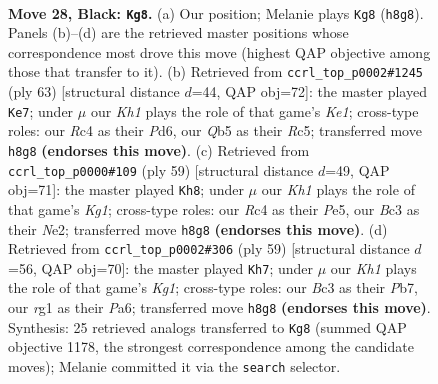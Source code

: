 \documentclass[11pt]{article}
\begin{document}
\clearpage

\begin{figure}[p]\centering
\begin{subfigure}{0.46\textwidth}\centering
\resizebox{\linewidth}{!}{%
\newchessgame
\chessboard[
  setfen={r6k/p7/4p1pQ/pq1p4/2rP2P1/2b5/2P5/3K2R1 b - - 1 28},
  showmover=false,
  pgfstyle=straightmove, color=movearrow, markmove={h8-g8}
]}
\caption{}
\end{subfigure}\hfill
\begin{subfigure}{0.46\textwidth}\centering
\resizebox{\linewidth}{!}{%
\newchessgame
\chessboard[
  setfen={4k1Q1/8/p2p4/1pr1q1p1/6Pb/8/PPP5/1K5R b - - 2 32},
  showmover=false,
  pgfstyle=straightmove, color=movearrow, markmove={e8-e7}
]}
\caption{}
\end{subfigure}
\\[4pt]
\begin{subfigure}{0.46\textwidth}\centering
\resizebox{\linewidth}{!}{%
\newchessgame
\chessboard[
  setfen={5rk1/p7/5pQ1/Pp1qp3/8/2P3P1/4nP2/R4K2 b - - 0 30},
  showmover=false,
  pgfstyle=straightmove, color=movearrow, markmove={g8-h8}
]}
\caption{}
\end{subfigure}\hfill
\begin{subfigure}{0.46\textwidth}\centering
\resizebox{\linewidth}{!}{%
\newchessgame
\chessboard[
  setfen={4Q1k1/1pr3p1/p2p4/P5p1/1Pqp4/5P2/6PP/R5K1 b - - 1 30},
  showmover=false,
  pgfstyle=straightmove, color=movearrow, markmove={g8-h7}
]}
\caption{}
\end{subfigure}
\caption{\textbf{Move 28, Black: \texttt{Kg8}.} (a) Our position; Melanie plays \texttt{Kg8} (\texttt{h8g8}). Panels (b)--(d) are the retrieved master positions whose correspondence most drove this move (highest QAP objective among those that transfer to it). (b) Retrieved from \texttt{ccrl\_top\_p0002\#1245} (ply 63) [structural distance $d$=44, QAP obj=72]: the master played \texttt{Ke7}; under $\mu$ our \emph{Kh1} plays the role of that game's \emph{Ke1}; cross-type roles: our \emph{R}c4 as their \emph{P}d6, our \emph{Q}b5 as their \emph{R}c5; transferred move \texttt{h8g8} \textbf{(endorses this move)}. (c) Retrieved from \texttt{ccrl\_top\_p0000\#109} (ply 59) [structural distance $d$=49, QAP obj=71]: the master played \texttt{Kh8}; under $\mu$ our \emph{Kh1} plays the role of that game's \emph{Kg1}; cross-type roles: our \emph{R}c4 as their \emph{P}e5, our \emph{B}c3 as their \emph{N}e2; transferred move \texttt{h8g8} \textbf{(endorses this move)}. (d) Retrieved from \texttt{ccrl\_top\_p0002\#306} (ply 59) [structural distance $d$=56, QAP obj=70]: the master played \texttt{Kh7}; under $\mu$ our \emph{Kh1} plays the role of that game's \emph{Kg1}; cross-type roles: our \emph{B}c3 as their \emph{P}b7, our \emph{r}g1 as their \emph{P}a6; transferred move \texttt{h8g8} \textbf{(endorses this move)}. Synthesis: 25 retrieved analogs transferred to \texttt{Kg8} (summed QAP objective 1178, the strongest correspondence among the candidate moves); Melanie committed it via the \texttt{search} selector.}
\label{fig:thought-m55}
\end{figure}
\end{document}
